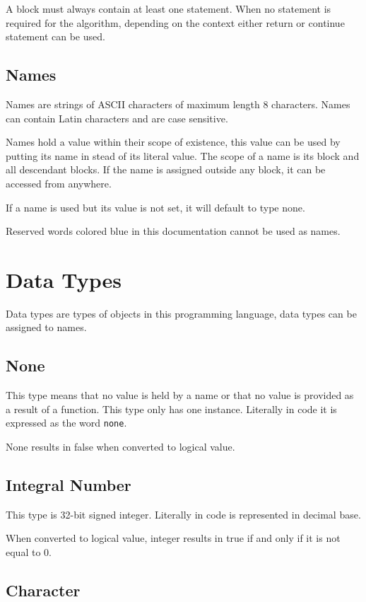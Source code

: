 \documentclass[a4paper,11pt,openany]{article}
\begin{document}
A block must always contain at least one statement. When no statement is required for the algorithm, depending on the context either return or continue statement can be used.

\subsection{Names}

Names are strings of ASCII characters of maximum length 8 characters. Names can contain Latin characters and are case sensitive.

Names hold a value within their scope of existence, this value can be used by putting its name in stead of its literal value. The scope of a name is its block and all descendant blocks. If the name is assigned outside any block, it can be accessed from anywhere.

If a name is used but its value is not set, it will default to type none.

Reserved words colored blue in this documentation cannot be used as names.
	
\section{Data Types}

Data types are types of objects in this programming language, data types can be assigned to names. 

\subsection{None}

This type means that no value is held by a name or that no value is provided as a result of a function. This type only has one instance. Literally in code it is expressed as the word \texttt{\color{blue!60!black}none}.

None results in false when converted to logical value.

\subsection{Integral Number}

This type is 32-bit signed integer. Literally in code is represented in decimal base.

When converted to logical value, integer results in true if and only if it is not equal to 0.

\subsection{Character}
\end{document}
